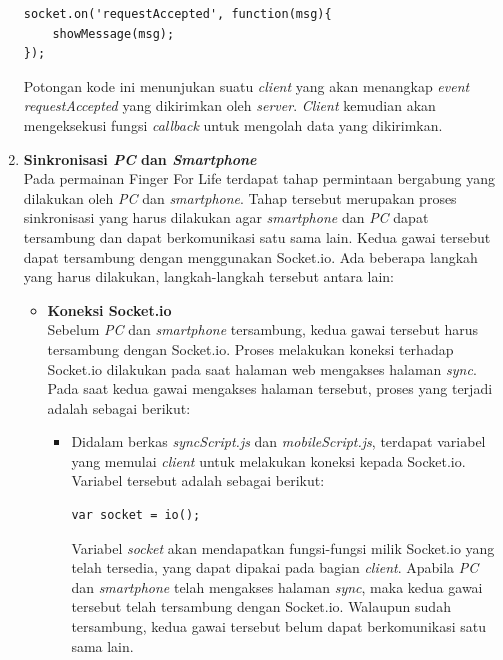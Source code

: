 \begin{enumerate}
\begin{lstlisting}[caption={proses \textit{event} diterima}, label={lst:req_accepted}, captionpos=b]
socket.on('requestAccepted', function(msg){
	showMessage(msg);
});
\end{lstlisting}
Potongan kode ini menunjukan suatu \textit{client} yang akan menangkap \textit{event requestAccepted} yang dikirimkan oleh \textit{server}. \textit{Client} kemudian akan mengeksekusi fungsi \textit{callback} untuk mengolah data yang dikirimkan.
	
	\item \textbf{Sinkronisasi \textit{PC} dan \textit{Smartphone}} \\
	Pada permainan Finger For Life terdapat tahap permintaan bergabung yang dilakukan oleh \textit{PC} dan \textit{smartphone}. Tahap tersebut merupakan proses sinkronisasi yang harus dilakukan agar \textit{smartphone} dan \textit{PC} dapat tersambung dan dapat berkomunikasi satu sama lain. Kedua gawai tersebut dapat tersambung dengan menggunakan Socket.io. Ada beberapa langkah yang harus dilakukan, langkah-langkah tersebut antara lain:
	\begin{itemize}
		\item \textbf{Koneksi Socket.io} \\
		Sebelum \textit{PC} dan \textit{smartphone} tersambung, kedua gawai tersebut harus tersambung dengan Socket.io. Proses melakukan koneksi terhadap Socket.io dilakukan pada saat halaman web mengakses halaman \textit{sync}. Pada saat kedua gawai mengakses halaman tersebut, proses yang terjadi adalah sebagai berikut:
		\begin{itemize}
			\item Didalam berkas \textit{syncScript.js} dan \textit{mobileScript.js}, terdapat variabel yang memulai \textit{client} untuk melakukan koneksi kepada Socket.io. Variabel tersebut adalah sebagai berikut:
\begin{lstlisting}
var socket = io();
\end{lstlisting}
			Variabel \textit{socket} akan mendapatkan fungsi-fungsi milik Socket.io yang telah tersedia, yang dapat dipakai pada bagian \textit{client}. Apabila \textit{PC} dan \textit{smartphone} telah mengakses halaman \textit{sync}, maka kedua gawai tersebut telah tersambung dengan Socket.io. Walaupun sudah tersambung, kedua gawai tersebut belum dapat berkomunikasi satu sama lain.
		\end{itemize}
	

\end{itemize}
\end{enumerate}
